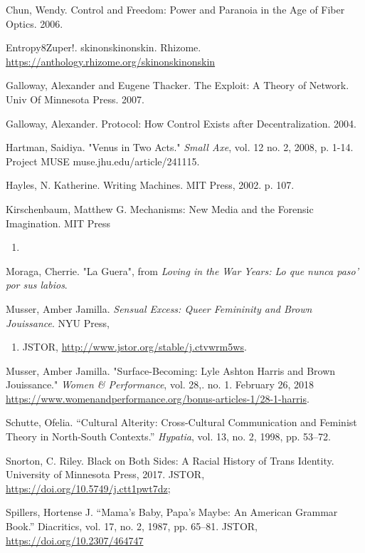 \documentclass[11pt]{article}
\begin{document}
Chun, Wendy. Control and Freedom: Power and Paranoia in the Age of Fiber Optics. 2006.

Entropy8Zuper!. skinonskinonskin. Rhizome. \url{https://anthology.rhizome.org/skinonskinonskin} 

Galloway, Alexander and Eugene Thacker. The Exploit: A Theory of Network. Univ Of 
Minnesota Press. 2007. 

Galloway, Alexander. Protocol: How Control Exists after
Decentralization. 2004.

Hartman, Saidiya. "Venus in Two Acts." \emph{Small Axe}, vol. 12 no. 2,
   2008, p. 1-14. Project MUSE muse.jhu.edu/article/241115.

Hayles, N. Katherine. Writing Machines. MIT Press, 2002. p. 107.

Kirschenbaum, Matthew G. Mechanisms: New Media and the Forensic Imagination. MIT Press 
\begin{enumerate}
\item 
\end{enumerate}

Moraga, Cherrie. "La Guera", from \emph{Loving in the War Years: Lo que
nunca paso' por sus labios}.

Musser, Amber Jamilla. \emph{Sensual Excess: Queer Femininity and Brown
Jouissance}. NYU Press,
\begin{enumerate}
\item JSTOR, \url{http://www.jstor.org/stable/j.ctvwrm5ws}.
\end{enumerate}

Musser, Amber Jamilla. "Surface-Becoming: Lyle Ashton Harris and Brown
  Jouissance." \emph{Women \& Performance}, vol. 28,. no. 1. February 26, 2018
  \url{https://www.womenandperformance.org/bonus-articles-1/28-1-harris}. 

Schutte, Ofelia. “Cultural Alterity: Cross-Cultural Communication and
Feminist Theory in North-South Contexts.” \emph{Hypatia}, vol. 13, no. 2,
1998, pp. 53–72.

Snorton, C. Riley. Black on Both Sides: A Racial History of Trans Identity. University of 
Minnesota Press, 2017. JSTOR, \url{https://doi.org/10.5749/j.ctt1pwt7dz};

Spillers, Hortense J. “Mama’s Baby, Papa’s Maybe: An American Grammar Book.” Diacritics, 
vol. 17, no. 2, 1987, pp. 65–81. JSTOR, \url{https://doi.org/10.2307/464747}
\end{document}
